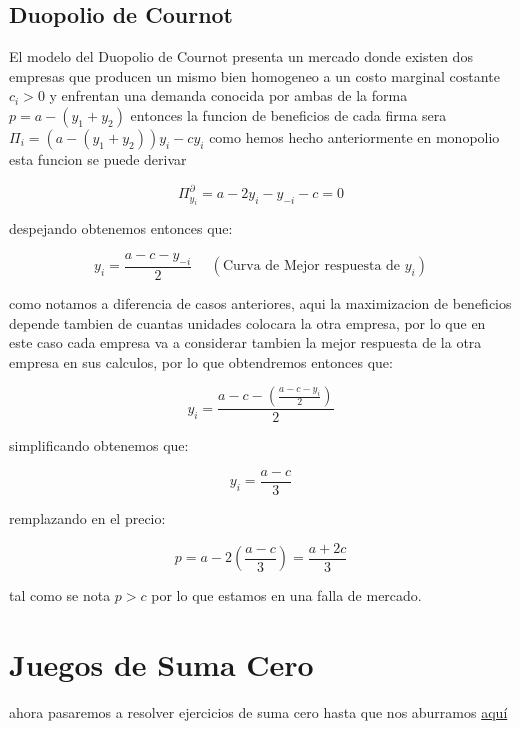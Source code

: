 \documentclass[11pt]{article}
\begin{document}
\subsection{Duopolio de Cournot}
\begin{flushleft}
    El modelo del Duopolio de Cournot presenta un mercado donde existen dos empresas que producen un mismo bien homogeneo a un costo marginal costante $c_i>0$ y enfrentan una demanda conocida por ambas de la forma $p=a-(y_1+y_2)$ entonces la funcion de beneficios de cada firma sera $\Pi_i = (a-(y_1+y_2))y_i-cy_i$ como hemos hecho anteriormente en monopolio esta funcion se puede derivar

    $$\Pi^\partial_{y_i} = a-2y_i-y_{-i}-c=0$$
    
    despejando obtenemos entonces que:
    
    $$y_i=\frac{a-c-y_{-i}}{2}~~~~~~(\text{Curva de Mejor respuesta de }y_i)$$
    
    como notamos a diferencia de casos anteriores, aqui la maximizacion de beneficios depende tambien de cuantas unidades colocara la otra empresa, por lo que en este caso cada empresa va a considerar tambien la mejor respuesta de la otra empresa en sus calculos, por lo que obtendremos entonces que:

    $$y_i=\frac{a-c-\left( \frac{a-c-y_{i}}{2} \right)}{2}$$

    simplificando obtenemos que:

    $$y_i=\frac{a-c}{3}$$

    remplazando en el precio:

    $$p=a-2\left(\frac{a-c}{3}\right)=\frac{a+2c}{3}$$

    tal como se nota $p>c$ por lo que estamos en una falla de mercado.
\end{flushleft}


\section{Juegos de Suma Cero}

ahora pasaremos a resolver ejercicios de suma cero hasta que nos aburramos \href{https://colab.research.google.com/drive/1a9GyRYlV3CaM9UwgZKaUVhhOs_YfPudB?usp=sharing}{aquí}


\newpage
\medskip

\nocite{*}
 

\newpage
\end{document}
